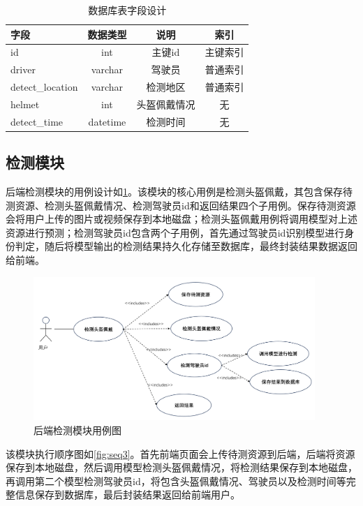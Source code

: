 \begin{table}[htbp]
    \centering
    \caption{数据库表字段设计} %
    \label{tab:datatable}
    \begin{tabular}{lccc} %
        \toprule %
        字段 & 数据类型 & 说明 & 索引 \\
        \midrule %
        id & int & 主键id & 主键索引 \\
        driver & varchar & 驾驶员 & 普通索引\\
        detect\_location & varchar & 检测地区 & 普通索引 \\
        helmet & int & 头盔佩戴情况 & 无 \\
        detect\_time & datetime & 检测时间 & 无 \\
        \bottomrule %
    \end{tabular}
\end{table}

\subsection{检测模块}

后端检测模块的用例设计如\ref{fig:uml3}。该模块的核心用例是检测头盔佩戴，其包含保存待测资源、检测头盔佩戴情况、检测驾驶员id和返回结果四个子用例。保存待测资源会将用户上传的图片或视频保存到本地磁盘；检测头盔佩戴用例将调用模型对上述资源进行预测；检测驾驶员id包含两个子用例，首先通过驾驶员id识别模型进行身份判定，随后将模型输出的检测结果持久化存储至数据库，最终封装结果数据返回给前端。
\begin{figure}[!htb]
    \centering
    \includegraphics[width=0.95\textwidth]{figs/chap05/uml3.png}
    \caption{后端检测模块用例图}
    \label{fig:uml3}
\end{figure}

该模块执行顺序图如\ref{fig:seq3}。首先前端页面会上传待测资源到后端，后端将资源保存到本地磁盘，然后调用模型检测头盔佩戴情况，将检测结果保存到本地磁盘，再调用第二个模型检测驾驶员id，将包含头盔佩戴情况、驾驶员以及检测时间等完整信息保存到数据库，最后封装结果返回给前端用户。

